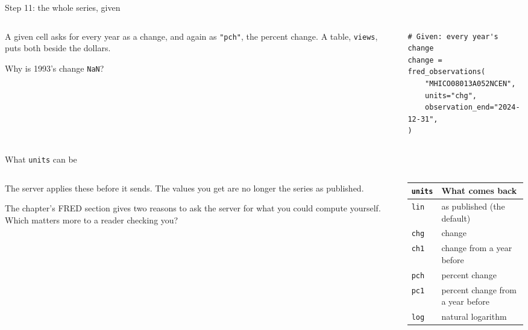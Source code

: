\documentclass[9pt,aspectratio=169]{beamer}
\begin{document}
\begin{frame}[fragile]{Step 11: the whole series, given}
    \begin{columns}[T]
        \begin{column}{0.37\textwidth}
            A given cell asks for every year as a change, and again as \texttt{"pch"}, the percent change. A table, \texttt{views}, puts both beside the dollars.

            \medskip
            Why is 1993's change \texttt{NaN}?
        \end{column}
        \begin{column}{0.6\textwidth}
\begin{lstlisting}
# Given: every year's change
change = fred_observations(
    "MHICO08013A052NCEN",
    units="chg",
    observation_end="2024-12-31",
)
\end{lstlisting}
        \end{column}
    \end{columns}
\end{frame}

\begin{frame}{What \texttt{units} can be}
    \begin{columns}[T]
        \begin{column}{0.37\textwidth}
            The server applies these before it sends. The values you get are no longer the series as published.

            \medskip
            The chapter's FRED section gives two reasons to ask the server for what you could compute yourself. Which matters more to a reader checking you?
        \end{column}
        \begin{column}{0.6\textwidth}
            \begin{center}\small
            \begin{tabular}{@{}ll@{}}
                \toprule
                \texttt{units} & \textbf{What comes back} \\
                \midrule
                \texttt{lin} & as published (the default) \\
                \texttt{chg} & change \\
                \texttt{ch1} & change from a year before \\
                \texttt{pch} & percent change \\
                \texttt{pc1} & percent change from a year before \\
                \texttt{log} & natural logarithm \\
                \bottomrule
            \end{tabular}
            \end{center}
        \end{column}
    \end{columns}
\end{frame}
\end{document}
